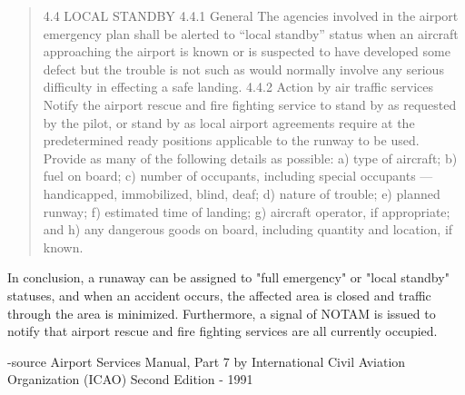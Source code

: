 \begin{quotation}
4.4 LOCAL STANDBY
4.4.1 General
The agencies involved in the airport emergency plan shall be alerted to “local standby” status when an aircraft
approaching the airport is known or is suspected to have developed some defect but the trouble is not such as would
normally involve any serious difficulty in effecting a safe landing.
4.4.2 Action by air traffic services
Notify the airport rescue and fire fighting service to stand by as requested by the pilot, or stand by as local airport
agreements require at the predetermined ready positions applicable to the runway to be used. Provide as many of the
following details as possible:
a) type of aircraft;
b) fuel on board;
c) number of occupants, including special occupants — handicapped, immobilized, blind, deaf;
d) nature of trouble;
e) planned runway;
f) estimated time of landing;
g) aircraft operator, if appropriate; and
h) any dangerous goods on board, including quantity and location, if known.
\end{quotation}


In conclusion, a runaway can be assigned to "full emergency" or "local standby" statuses, and when an accident occurs, the affected area is closed and traffic through the area is minimized. Furthermore, a signal of NOTAM is issued to notify that airport rescue and fire fighting services are all currently occupied.



-source
Airport Services Manual, Part 7 by International Civil Aviation Organization (ICAO)
Second Edition - 1991